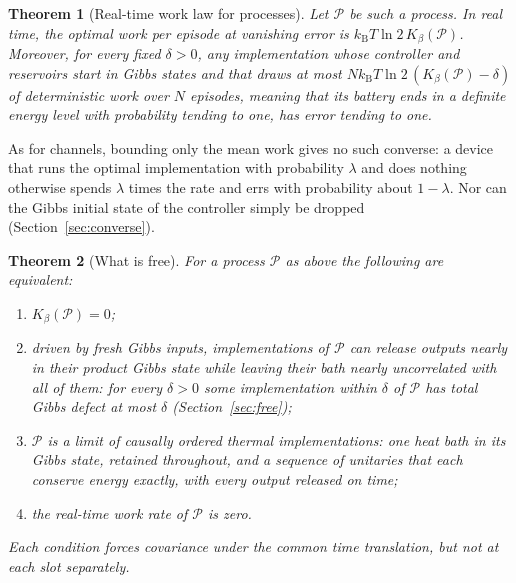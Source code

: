 \documentclass[11pt]{article}
\newtheorem{theorem}{Theorem}
\theoremstyle{definition}
\theoremstyle{remark}
\newcommand{\kB}{k_{\mathrm B}}
\newcommand{\Kb}{K_\beta}
\newcommand{\Pp}{\mathcal P}
\begin{document}
\begin{theorem}[Real-time work law for processes]\label{thm:law}
Let $\Pp$ be such a process. In real time, the optimal work per episode at vanishing error is $\kB T\ln2\,\Kb(\Pp)$. Moreover, for every fixed $\delta>0$, any implementation whose controller and reservoirs start in Gibbs states and that draws at most $N\kB T\ln2\,(\Kb(\Pp)-\delta)$ of deterministic work over $N$ episodes, meaning that its battery ends in a definite energy level with probability tending to one, has error tending to one.
\end{theorem}

As for channels, bounding only the mean work gives no such converse: a device that runs the optimal implementation with probability $\lambda$ and does nothing otherwise spends $\lambda$ times the rate and errs with probability about $1-\lambda$. Nor can the Gibbs initial state of the controller simply be dropped (Section~\ref{sec:converse}).

\begin{theorem}[What is free]\label{thm:free}
For a process $\Pp$ as above the following are equivalent:
\begin{enumerate}[label=(\roman*)]
\item $\Kb(\Pp)=0$;
\item driven by fresh Gibbs inputs, implementations of $\Pp$ can release outputs nearly in their product Gibbs state while leaving their bath nearly uncorrelated with all of them: for every $\delta>0$ some implementation within $\delta$ of $\Pp$ has total Gibbs defect at most $\delta$ (Section~\ref{sec:free});
\item $\Pp$ is a limit of causally ordered thermal implementations: one heat bath in its Gibbs state, retained throughout, and a sequence of unitaries that each conserve energy exactly, with every output released on time;
\item the real-time work rate of $\Pp$ is zero.
\end{enumerate}
Each condition forces covariance under the common time translation, but not at each slot separately.
\end{theorem}
\end{document}
